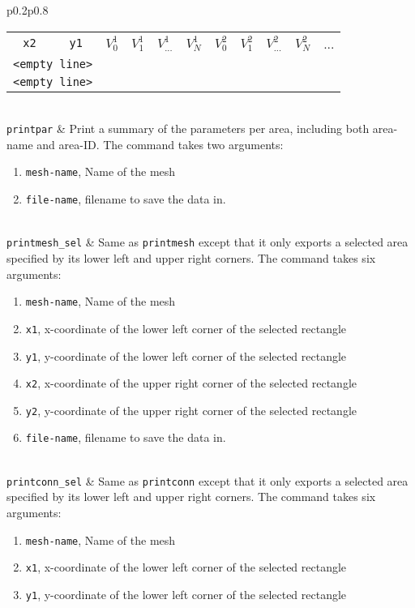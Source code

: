 \documentclass[noshowpacs,preprintnumbers,amsmath,amssymb, letter]{revtex4}
\begin{document}
\begin{longtable}{p{}p{}}
\begin{tabular}{ccccccccccc}
	\texttt{x2} & \texttt{y1} & $V_0^1$ & $V_1^1$ & $V_{...}^1$ & $V_N^1$ & $V_0^2$ & $V_1^2$ & $V_{...}^2$ & $V_N^2$& ...\\
	\multicolumn{2}{l}{\texttt{<empty line>}}\\
	\multicolumn{2}{l}{\texttt{<empty line>}}\\
\end{tabular}\\
\texttt{printpar}	& Print a summary of the parameters per area, including both area-name and area-ID. The command takes two arguments:
\begin{enumerate}
\item \texttt{mesh-name}, Name of the mesh
\item \texttt{file-name}, filename to save the data in.
\end{enumerate}\\
\texttt{printmesh\_sel}	& Same as \texttt{printmesh} except that it only exports a selected area specified by its lower left and upper right corners. The command takes six arguments:
\begin{enumerate}
\item \texttt{mesh-name}, Name of the mesh
\item \texttt{x1}, x-coordinate of the lower left corner of the selected rectangle
\item \texttt{y1}, y-coordinate of the lower left corner of the selected rectangle
\item \texttt{x2}, x-coordinate of the upper right corner of the selected rectangle
\item \texttt{y2}, y-coordinate of the upper right corner of the selected rectangle
\item \texttt{file-name}, filename to save the data in.
\end{enumerate}\\
\texttt{printconn\_sel}	& Same as \texttt{printconn} except that it only exports a selected area specified by its lower left and upper right corners. The command takes six arguments:
\begin{enumerate}
\item \texttt{mesh-name}, Name of the mesh
\item \texttt{x1}, x-coordinate of the lower left corner of the selected rectangle
\item \texttt{y1}, y-coordinate of the lower left corner of the selected rectangle

\end{enumerate}
\end{longtable}
\end{document}
